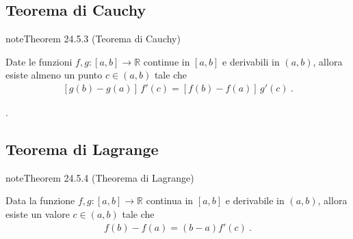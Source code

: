 \documentclass[letterpaper,10pt,italian]{jupyterBook}
\begin{document}
\subsection{Teorema di Cauchy}
\label{\detokenize{ch/infinitesimal_calculus/derivatives:teorema-di-cauchy}}\label{\detokenize{ch/infinitesimal_calculus/derivatives:infinitesimal-calculus-derivatives-thm-cauchy}}\label{ch/infinitesimal_calculus/derivatives:thm:infinitesimal-calculus:derivatives:thm:cauchy}
\begin{sphinxadmonition}{note}{Theorem 24.5.3 (Teorema di Cauchy)}



\sphinxAtStartPar
Date le funzioni \(f, g: [a,b] \rightarrow \mathbb{R}\) continue in \([a,b]\) e derivabili in \((a,b)\), allora esiste almeno un punto \(c \in (a,b)\) tale che
\begin{equation*}
\begin{split}\left[ g(b) - g(a) \right] \, f'(c) = \left[ f(b) - f(a) \right] \, g'(c) \ .\end{split}
\end{equation*}\end{sphinxadmonition}

\sphinxAtStartPar
{\hyperref[\detokenize{ch/infinitesimal_calculus/derivatives-notes:infinitesimal-calculus-derivatives-thm-cauchy-notes}]{}}.


\subsection{Teorema di Lagrange}
\label{\detokenize{ch/infinitesimal_calculus/derivatives:teorema-di-lagrange}}\label{\detokenize{ch/infinitesimal_calculus/derivatives:infinitesimal-calculus-derivatives-thm-lagrange}}\label{ch/infinitesimal_calculus/derivatives:thm:infinitesimal-calculus:derivatives:thm:lagrange}
\begin{sphinxadmonition}{note}{Theorem 24.5.4 (Theorema di Lagrange)}



\sphinxAtStartPar
Data la funzione \(f, g: [a,b] \rightarrow \mathbb{R}\) continua in \([a,b]\) e derivabile in \((a,b)\), allora esiste un valore \(c \in (a,b)\) tale che
\begin{equation*}
\begin{split}f(b) - f(a) = (b -  a) f'(c) \ .\end{split}
\end{equation*}\end{sphinxadmonition}
\end{document}
